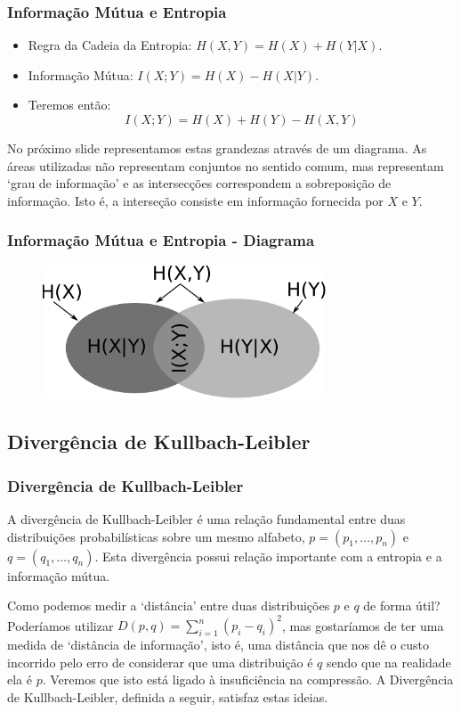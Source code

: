 \begin{frame}%
  \frametitle{Informação Mútua e Entropia}
  \begin{itemize}
  \item Regra da Cadeia da Entropia: $H(X,Y) = H(X) + H(Y|X)$.
  \item Informação Mútua: $I(X;Y) = H(X) - H(X|Y)$.
  \item Teremos então: 
        \begin{equation}
        I(X;Y) = H(X) + H(Y) - H(X,Y)
        \end{equation}
  \end{itemize}

   No próximo slide representamos estas grandezas através de um diagrama.
   As áreas utilizadas não representam conjuntos no sentido comum, mas
   representam `grau de informação' e as intersecções correspondem a
   sobreposição de informação. Isto é, a interseção consiste em informação
   fornecida por $X$ e $Y$.
\end{frame}

\begin{frame}%
  \frametitle{Informação Mútua e Entropia - Diagrama}

  \begin{figure}[h!]
  \centering
  \includegraphics[width=0.75\textwidth]{images/info-set.pdf}
  \label{fig:info-set}
  \end{figure}

\end{frame}

\subsection{Divergência de Kullbach-Leibler}
\begin{frame}%
  \frametitle{Divergência de Kullbach-Leibler}
  A divergência de Kullbach-Leibler é uma relação fundamental entre duas 
  distribuições probabilísticas sobre um mesmo alfabeto, $p=(p_1, \ldots, p_n)$
  e $q=(q_1, \ldots , q_n)$. Esta divergência possui relação importante com a
  entropia e a informação mútua. 

  \vspace{1cm}
  Como podemos medir a `distância' entre duas distribuições $p$ e $q$ de forma útil?
  Poderíamos utilizar $D(p,q) = \sum_{i=1}^n (p_i - q_i)^2$, mas gostaríamos de ter
  uma medida de `distância de informação', isto é, uma distância que nos dê o custo
  incorrido pelo erro de considerar que uma distribuição é $q$ sendo que na realidade
  ela é $p$. Veremos que isto está ligado à insuficiência na compressão. 
  A Divergência de Kullbach-Leibler, definida a seguir, satisfaz estas ideias.
\end{frame}


